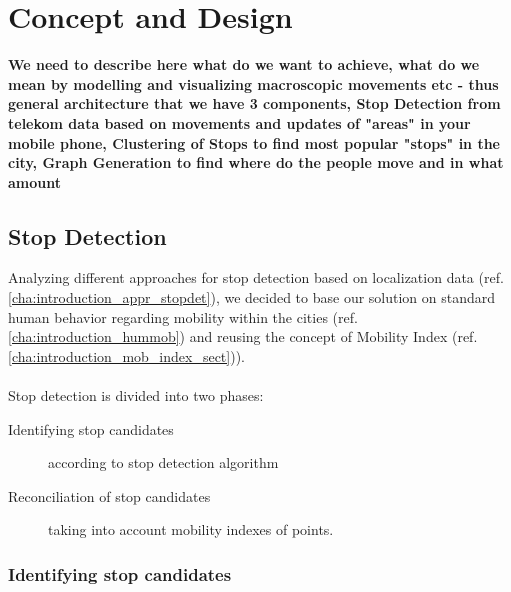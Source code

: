 \chapter{Concept and Design}
\label{cha:conceptanddesign}

\textbf{We need to describe here what do we want to achieve, what do we mean by modelling and visualizing macroscopic movements etc - thus general architecture that we have 3 components, Stop Detection from telekom data based on movements and updates of "areas" in your mobile phone, Clustering of Stops to find most popular "stops" in the city, Graph Generation to find where do the people move and in what amount
}
\section{Stop Detection}

Analyzing different approaches for stop detection based on localization data (ref. \autoref{cha:introduction_appr_stopdet}), we decided to base our solution on standard human behavior regarding mobility within the cities (ref. \autoref{cha:introduction_hummob}) and reusing the concept of Mobility Index (ref. \autoref{cha:introduction_mob_index_sect})).
\\\\
Stop detection is divided into two phases:
\begin{description}
	\item[Identifying stop candidates] according to stop detection algorithm
	\item[Reconciliation of stop candidates] taking into account mobility indexes of points. 
\end{description}

\subsection{Identifying stop candidates}

